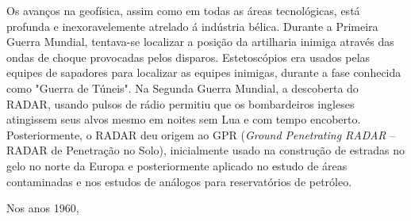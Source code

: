 \documentclass[a4paper,11pt]{scrbook}
\begin{document}
Os avan\c{c}os na geof\'isica, assim como em todas as \'areas tecnol\'ogicas, est\'a profunda e inexoravelemente atrelado \'a ind\'ustria b\'elica.
Durante a Primeira Guerra Mundial, tentava-se localizar a posi\c{c}\~ao da artilharia inimiga atrav\'es das ondas de choque provocadas pelos disparos.
Estetosc\'opios era usados pelas equipes de sapadores para localizar as equipes inimigas, durante a fase conhecida como "Guerra de T\'uneis".
Na Segunda Guerra Mundial, a descoberta do RADAR, usando pulsos de r\'adio permitiu que os bombardeiros ingleses atingissem seus alvos mesmo em noites sem Lua e com tempo encoberto.
Posteriormente, o RADAR deu origem ao GPR (\emph{Ground Penetrating RADAR} -- RADAR de Penetra\c{c}\~ao no Solo), inicialmente usado na constru\c{c}\~ao de estradas no gelo no norte da Europa e posteriormente aplicado no estudo de \'areas contaminadas e nos estudos de an\'alogos para reservat\'orios de petr\'oleo.

Nos anos 1960, 




\end{document}
